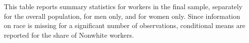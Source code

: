 %
\begin{table}[htbp!]
    \caption{Summary statistics, \yearmin{}--\yearmax{}}\label{tab:sum_stats_main_text}
    \resizebox{\textwidth}{!}{%
    
    } 
    \begin{tablenotes}
        \footnotesize
        This table reports summary statistics for workers in the final sample, separately for the overall population, for men only, and for women only. Since information on race is missing for a significant number of observations, conditional means are reported for the share of Nonwhite workers.
    \end{tablenotes}
    \begin{tablenotes}[Source]
        \sourcedata
    \end{tablenotes}
\end{table}
%
